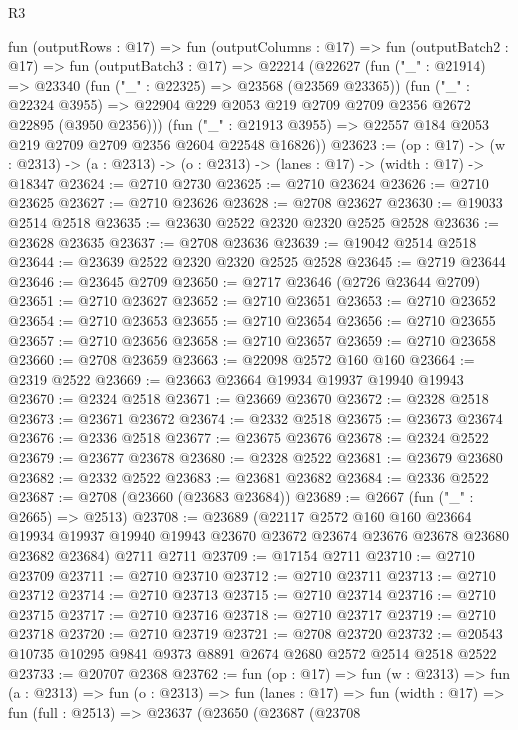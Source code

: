 \begin{lexlean}{R3}
\begin{coremodule}
  fun (outputRows : @17) =>
  fun (outputColumns : @17) =>
  fun (outputBatch2 : @17) =>
  fun (outputBatch3 : @17) =>
  @22214
    (@22627
      (fun ("_" : @21914) =>
      @23340
        (fun ("_" : @22325) => @23568 (@23569 @23365))
        (fun ("_" : @22324 @3955) =>
        @22904 @229 @2053 @219 @2709 @2709 @2356 @2672 @22895 (@3950 @2356)))
      (fun ("_" : @21913 @3955) => @22557 @184 @2053 @219 @2709 @2709 @2356 @2604 @22548 @16826))
@23623 := (op : @17) ->
  (w : @2313) -> (a : @2313) -> (o : @2313) -> (lanes : @17) -> (width : @17) -> @18347
@23624 := @2710 @2730
@23625 := @2710 @23624
@23626 := @2710 @23625
@23627 := @2710 @23626
@23628 := @2708 @23627
@23630 := @19033 @2514 @2518
@23635 := @23630 @2522 @2320 @2320 @2525 @2528
@23636 := @23628 @23635
@23637 := @2708 @23636
@23639 := @19042 @2514 @2518
@23644 := @23639 @2522 @2320 @2320 @2525 @2528
@23645 := @2719 @23644
@23646 := @23645 @2709
@23650 := @2717 @23646 (@2726 @23644 @2709)
@23651 := @2710 @23627
@23652 := @2710 @23651
@23653 := @2710 @23652
@23654 := @2710 @23653
@23655 := @2710 @23654
@23656 := @2710 @23655
@23657 := @2710 @23656
@23658 := @2710 @23657
@23659 := @2710 @23658
@23660 := @2708 @23659
@23663 := @22098 @2572 @160 @160
@23664 := @2319 @2522
@23669 := @23663 @23664 @19934 @19937 @19940 @19943
@23670 := @2324 @2518
@23671 := @23669 @23670
@23672 := @2328 @2518
@23673 := @23671 @23672
@23674 := @2332 @2518
@23675 := @23673 @23674
@23676 := @2336 @2518
@23677 := @23675 @23676
@23678 := @2324 @2522
@23679 := @23677 @23678
@23680 := @2328 @2522
@23681 := @23679 @23680
@23682 := @2332 @2522
@23683 := @23681 @23682
@23684 := @2336 @2522
@23687 := @2708 (@23660 (@23683 @23684))
@23689 := @2667 (fun ("_" : @2665) => @2513)
@23708 := @23689
    (@22117
      @2572
      @160
      @160
      @23664
      @19934
      @19937
      @19940
      @19943
      @23670
      @23672
      @23674
      @23676
      @23678
      @23680
      @23682
      @23684)
    @2711
    @2711
@23709 := @17154 @2711
@23710 := @2710 @23709
@23711 := @2710 @23710
@23712 := @2710 @23711
@23713 := @2710 @23712
@23714 := @2710 @23713
@23715 := @2710 @23714
@23716 := @2710 @23715
@23717 := @2710 @23716
@23718 := @2710 @23717
@23719 := @2710 @23718
@23720 := @2710 @23719
@23721 := @2708 @23720
@23732 := @20543 @10735 @10295 @9841 @9373 @8891 @2674 @2680 @2572 @2514 @2518 @2522
@23733 := @20707 @2368
@23762 := fun (op : @17) =>
  fun (w : @2313) =>
  fun (a : @2313) =>
  fun (o : @2313) =>
  fun (lanes : @17) =>
  fun (width : @17) =>
  fun (full : @2513) =>
  @23637
    (@23650
      (@23687
        (@23708

\end{coremodule}
\end{lexlean}
